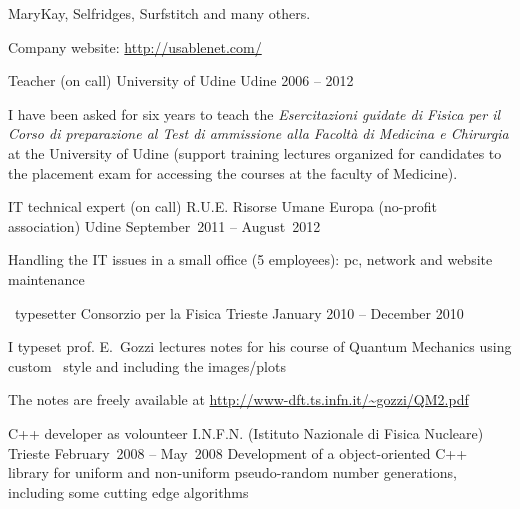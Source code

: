 \begin{cventries}
{\begin{cvitems}
   MaryKay, Selfridges, Surfstitch and many others.
\item Company website: \url{http://usablenet.com/}
	\end{cvitems}
}
\cventry
{Teacher (on call)}
{University of Udine}
{Udine}
{2006 -- 2012}
{
	\begin{cvitems}
	\item 
   I have been asked for six years to teach  the \emph{Esercitazioni guidate di Fisica per il Corso
      di preparazione al Test di ammissione alla Facolt\`a di Medicina e
      Chirurgia} at the University of Udine (support training lectures
   organized
for candidates to the placement exam for accessing the courses at the faculty
of Medicine).
	\end{cvitems}
}
\cventry
{IT technical expert (on call)}
{R.U.E. Risorse Umane Europa (no-profit
   association)}
{Udine}
{September~2011 -- August~2012}
{
	\begin{cvitems}
	\item 
   Handling the IT issues in a small office (5 employees): pc, network and
   website maintenance
	\end{cvitems}
   }
\cventry
{\LaTeXe\ typesetter}
{Consorzio per la Fisica}
{Trieste}
{January 2010 -- December 2010}
{   
	\begin{cvitems}
	\item 
I typeset prof. E.~Gozzi lectures notes for his course of Quantum Mechanics using custom \LaTeXe\ style and including the images/plots
\item
   The notes are freely  available at 
   \url{http://www-dft.ts.infn.it/~gozzi/QM2.pdf}
	\end{cvitems}
		}
\cventry
{C++ developer as volounteer}
{I.N.F.N. (Istituto Nazionale di Fisica
   Nucleare)}
{Trieste}
{February~2008 -- May~2008}
{Development of a object-oriented C++ library for uniform and non-uniform
   pseudo-random number generations, including some cutting edge algorithms}

\end{cventries}

